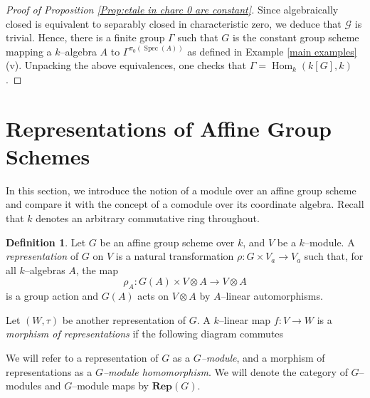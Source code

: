 \documentclass{article}
\theoremstyle{plain}
\theoremstyle{definition}
\newtheorem{Def}[Th]{Definition}
\DeclareMathOperator{\id}{id}
\DeclareMathOperator{\Hom}{Hom}
\DeclareMathOperator{\Spec}{Spec}
\begin{document}
\begin{proof}[Proof of Proposition \ref{Prop:etale in charc 0 are constant}] 
Since algebraically closed is equivalent to separably closed in characteristic zero, we deduce that $\mathcal{G}$ is trivial. Hence, there is a finite group $\Gamma$ such that $G$ is the constant group scheme mapping a $k$--algebra $A$ to $\Gamma^{\pi_0(\Spec (A) )}$ as defined in Example \ref{main examples}(v). Unpacking the above equivalences, one checks that $\Gamma=\Hom_k(k[G],k)$.
\end{proof}





\pagebreak
\section{Representations of Affine Group Schemes}

In this section, we introduce the notion of a module over an affine group scheme and compare it with the concept of a comodule over its coordinate algebra. Recall that $k$  denotes an arbitrary commutative ring throughout.

\begin{Def}
    Let $G$ be an affine group scheme over $k$, and $V$ be a $k$--module. A \textit{representation} of $G$ on $V$ is a natural transformation $\rho\colon  G\times V_a\to V_a$ such that, for all $k$--algebras $A$, the map 
    \[
    \rho_A\colon G(A)\times V\otimes A\to V\otimes A
    \]
    is a group action and $G(A)$ acts on $V\otimes A$ by $A$--linear automorphisms.

    Let $(W,\tau)$ be another representation of $G$. A $k$--linear map $f\colon V\to W$ is a \textit{morphism of representations} if the following diagram commutes
    \begin{center}
    \end{center}
    We will refer to a representation of $G$ as a \textit{$G$--module}, and a morphism of representations as a \textit{$G$--module homomorphism}. We will denote the category of $G$--modules and $G$--module maps by $\mathbf{Rep}(G)$.
\end{Def}
\end{document}
